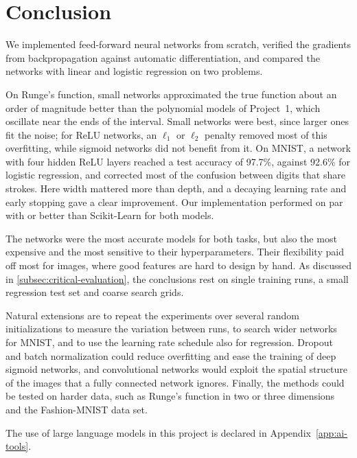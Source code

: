 \section{Conclusion}\label{sec:conclusion}


We implemented feed-forward neural networks from scratch, verified the gradients from
backpropagation against automatic differentiation, and compared the networks with linear and
logistic regression on two problems.

On Runge's function, small networks approximated the true function about an order of
magnitude better than the polynomial models of Project~1, which oscillate near the ends of the
interval. Small networks were best, since larger ones fit the noise; for ReLU networks, an
$\ell_1$ or $\ell_2$ penalty removed most of this overfitting, while sigmoid networks did not
benefit from it. On MNIST, a network with four hidden ReLU layers reached a test accuracy of
97.7\%, against 92.6\% for logistic regression, and corrected most of the confusion between
digits that share strokes. Here width mattered more than depth, and a decaying learning rate
and early stopping gave a clear improvement. Our implementation performed on par with or
better than Scikit-Learn for both models.

The networks were the most accurate models for both tasks, but also the most expensive and
the most sensitive to their hyperparameters. Their flexibility paid off most for images, where
good features are hard to design by hand. As discussed in \cref{subsec:critical-evaluation},
the conclusions rest on single training runs, a small regression test set and coarse search
grids.

Natural extensions are to repeat the experiments over several random initializations to
measure the variation between runs, to search wider networks for MNIST, and to use the
learning rate schedule also for regression. Dropout and batch normalization could reduce
overfitting and ease the training of deep sigmoid networks, and convolutional networks would
exploit the spatial structure of the images that a fully connected network ignores. Finally,
the methods could be tested on harder data, such as Runge's function in two or three
dimensions and the Fashion-MNIST data set.

The use of large language models in this project is declared in
Appendix~\ref{app:ai-tools}.
